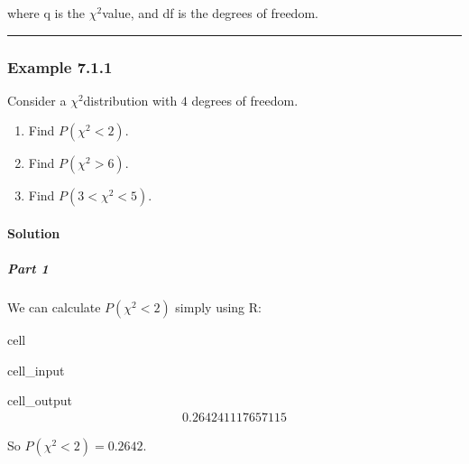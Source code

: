 \documentclass[letterpaper,10pt,english]{jupyterBook}
\begin{document}
\sphinxAtStartPar
where q is the \(\chi^2\)\sphinxhyphen{}value, and df is the degrees of freedom.


\bigskip\hrule\bigskip



\subsubsection{Example 7.1.1}
\label{\detokenize{Ch7 The Chi-Square Distribution/7.1 The Chi-Square Distribution:example-7-1-1}}
\sphinxAtStartPar
Consider a \(\chi^2\)\sphinxhyphen{}distribution with \(4\) degrees of freedom.
\begin{enumerate}
%
\item {} 
\sphinxAtStartPar
Find \(P(\chi^2 < 2)\).

\item {} 
\sphinxAtStartPar
Find \(P(\chi^2 > 6)\).

\item {} 
\sphinxAtStartPar
Find \(P(3 < \chi^2 < 5)\).

\end{enumerate}


\paragraph{Solution}
\label{\detokenize{Ch7 The Chi-Square Distribution/7.1 The Chi-Square Distribution:solution}}

\subparagraph{Part 1}
\label{\detokenize{Ch7 The Chi-Square Distribution/7.1 The Chi-Square Distribution:part-1}}
\sphinxAtStartPar
We can calculate \(P(\chi^2 < 2)\) simply using R:

\begin{sphinxuseclass}{cell}\begin{sphinxVerbatimInput}

\begin{sphinxuseclass}{cell_input}
\begin{sphinxVerbatim}[commandchars=\\\{\}]
\end{sphinxVerbatim}

\end{sphinxuseclass}\end{sphinxVerbatimInput}
\begin{sphinxVerbatimOutput}

\begin{sphinxuseclass}{cell_output}\begin{equation*}
\begin{split}0.264241117657115\end{split}
\end{equation*}
\end{sphinxuseclass}\end{sphinxVerbatimOutput}

\end{sphinxuseclass}
\sphinxAtStartPar
So \(P( \chi^2 < 2) = 0.2642\).
\end{document}
